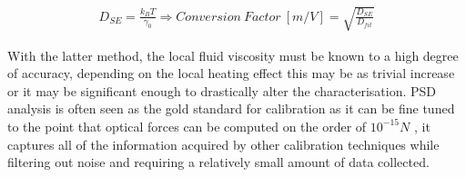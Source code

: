 \documentclass[a4paper,oneside,11pt]{book}
\begin{document}
\begin{align}
	\label{eq:correction_factor}
	D_{SE} = \frac{k_BT}{\gamma_0} \Rightarrow Conversion\ Factor \ [m/V]= \sqrt{\frac{D_{SE}}{D_{fit}}}
\end{align}

With the latter method, the local fluid viscosity must be known to a high degree of accuracy, depending on the local heating effect this may be as trivial increase or it may be significant enough to drastically alter the characterisation. PSD analysis is often seen as the gold standard for calibration as it can be fine tuned to the point that optical forces can be computed on the order of $10^{-15} N$ \cite{BergSoerensen2004}, it captures all of the information acquired by other calibration techniques while filtering out noise and requiring a relatively small amount of data collected. 
\end{document}
